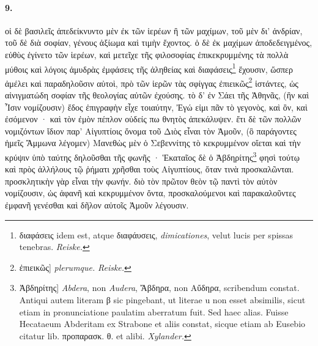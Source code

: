\documentclass[a4paper, 11pt, oneside, polutonikogreek, german]{article}
\begin{document}
\paragraph{9.}
οἱ δὲ βασιλεῖς ἀπεδείκνυντο μὲν ἐκ τῶν ἱερέων ἢ τῶν μαχίμων, τοῦ μὲν δι' ἀνδρίαν, τοῦ δὲ διὰ σοφίαν, γένους ἀξίωμα καὶ τιμὴν ἔχοντος. ὁ δὲ ἐκ μαχίμων ἀποδεδειγμένος, εὐθὺς ἐγίνετο τῶν ἱερέων, καὶ μετεῖχε τῆς φιλοσοφίας ἐπικεκρυμμένης τὰ πολλὰ μύθοις καὶ λόγοις ἀμυδρὰς ἐμφάσεις τῆς ἀληθείας καὶ διαφάσεις\footnote{διαφάσεις idem est, atque διαφάυσεις, \emph{dimicationes}, velut lucis per spissas tenebras. \emph{Reiske.}} ἔχουσιν, ὥσπερ ἀμέλει καὶ παραδηλοῦσιν αὐτοὶ, πρὸ τῶν ἱερῶν τὰς σφίγγας ἐπιεικῶς\footnote{ἐπιεικῶς] \emph{plerumque.} \emph{Reiske.}} ἱστάντες, ὡς αἰνιγματώδη σοφίαν τῆς θεολογίας αὐτῶν ἐχούσης. τὸ δ' ἐν Σάει τῆς Ἀθηνᾶς, (ἣν καὶ Ἶσιν νομίζουσιν) ἕδος ἐπιγραφὴν εἶχε τοιαύτην, Ἐγώ εἰμι πᾶν τὸ γεγονὸς, καὶ ὂν, καὶ ἐσόμενον · καὶ τὸν ἐμὸν πέπλον οὐδείς πω θνητὸς ἀπεκάλυψεν. ἔτι δὲ τῶν πολλῶν νομιζόντων ἴδιον παρ' Αἰγυπτίοις ὄνομα τοῦ Διὸς εἶναι τὸν Ἀμοῦν, (ὃ παράγοντες ἡμεῖς Ἄμμωνα λέγομεν) Μανεθὼς μὲν ὁ Σεβεννίτης τὸ κεκρυμμένον οἴεται καὶ τὴν κρύψιν ὑπὸ ταύτης δηλοῦσθαι τῆς φωνῆς · Ἑκαταῖος δὲ ὁ Ἀβδηρίτης\footnote{Ἀβδηρίτης] \emph{Abdera}, non \emph{Audera}, Ἄβδηρα, non Αὔδηρα, scribendum constat. Antiqui autem literam β sic pingebant, ut literae u non esset absimilis, sicut etiam in pronunciatione paulatim aberratum fuit. Sed haec alias. Fuisse Hecataeum Abderitam ex Strabone et aliis constat, sicque etiam ab Eusebio citatur lib. προπαρασκ. θ. et alibi. \emph{Xylander.}} φησὶ τούτῳ καὶ πρὸς ἀλλήλους τῷ ῥήματι χρῆσθαι τοὺς Αἰγυπτίους, ὅταν τινὰ προσκαλῶνται. προσκλητικὴν γὰρ εἶναι τὴν φωνήν. διὸ τὸν πρῶτον θεὸν τῷ παντὶ τὸν αὐτὸν νομίζουσιν, ὡς ἀφανῆ καὶ κεκρυμμένον ὄντα, προσκαλούμενοι καὶ παρακαλοῦντες ἐμφανῆ γενέσθαι καὶ δῆλον αὐτοῖς Ἀμοῦν λέγουσιν.
\end{document}
